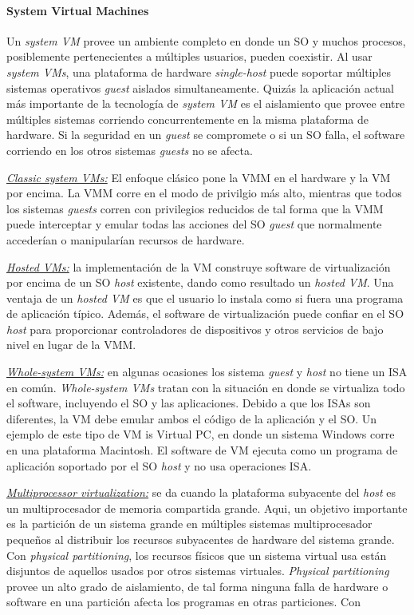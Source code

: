 \paragraph{\textnormal{\textbf{System Virtual Machines}}}
Un \emph{system VM} provee un ambiente completo en donde un SO y muchos procesos, posiblemente pertenecientes a múltiples usuarios, pueden coexistir. Al usar \emph{system VMs}, una plataforma de hardware \emph{single-host} puede soportar múltiples sistemas operativos \emph{guest} aislados simultaneamente. Quizás la aplicación actual más importante de la tecnología de \emph{system VM} es el aislamiento que provee entre múltiples sistemas corriendo concurrentemente en la misma plataforma de hardware. Si la seguridad en un \emph{guest} se compromete o si un SO falla, el software corriendo en los otros sistemas \emph{guests} no se afecta. 

\underline{\textit{Classic system VMs:}} El enfoque clásico pone la VMM en el hardware y la VM por encima. La VMM corre en el modo de privilgio más alto, mientras que todos los sistemas \emph{guests} corren con privilegios reducidos de tal forma que la VMM puede interceptar y emular todas las acciones del SO \emph{guest} que normalmente accederían o manipularían recursos de hardware. 

\underline{\textit{Hosted VMs:}} la implementación de la VM construye software de virtualización por encima de un SO \emph{host} existente, dando como resultado un \emph{hosted VM}. Una ventaja de un \emph{hosted VM} es que el usuario lo instala como si fuera una programa de aplicación típico. Además, el software de virtualización puede confiar en el SO \emph{host} para proporcionar controladores de dispositivos y otros servicios de bajo nivel en lugar de la VMM. 

\underline{\textit{Whole-system VMs:}} en algunas ocasiones los sistema \emph{guest} y \emph{host} no tiene un ISA en común. \emph{Whole-system VMs} tratan con la situación en donde se virtualiza todo el software, incluyendo el SO y las aplicaciones. Debido a que los ISAs son diferentes, la VM debe emular ambos el código de la aplicación y el SO.  Un ejemplo de este tipo de VM is Virtual PC, en donde un sistema Windows corre en una plataforma Macintosh. El software de VM ejecuta como un programa de aplicación soportado por el SO \emph{host} y no usa operaciones ISA. 

\underline{\textit{Multiprocessor virtualization:}} se da cuando la plataforma  subyacente del \emph{host} es un multiprocesador de memoria compartida grande. Aqui, un objetivo importante es la partición de un sistema grande en múltiples sistemas multiprocesador pequeños al distribuir los recursos subyacentes de hardware del sistema grande. Con \emph{physical partitioning}, los recursos físicos que un sistema virtual usa están disjuntos de aquellos usados por otros sistemas virtuales. \emph{Physical partitioning} provee un alto grado de aislamiento, de tal forma ninguna falla de hardware o software en una partición afecta los programas en otras particiones. Con 

